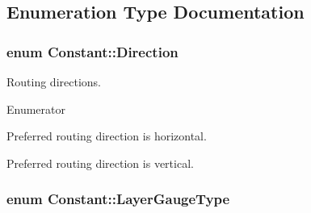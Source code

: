 \subsection{Enumeration Type Documentation}
\hypertarget{namespaceConstant_ac081a99f2b64361919ed5d9f37c0f9af}{
\subsubsection[{Direction}]{\setlength{\rightskip}{0pt plus 5cm}enum {\bf Constant\-::\-Direction}}}\label{namespaceConstant_ac081a99f2b64361919ed5d9f37c0f9af}
Routing directions. \begin{Desc}
\item[Enumerator]\par
\begin{description}
\item[{\em 
\hypertarget{namespaceConstant_ac081a99f2b64361919ed5d9f37c0f9afa7a545ff2d744fe30bfac294dfe9d03db}{Horizontal}\label{namespaceConstant_ac081a99f2b64361919ed5d9f37c0f9afa7a545ff2d744fe30bfac294dfe9d03db}
}]Preferred routing direction is horizontal. \item[{\em 
\hypertarget{namespaceConstant_ac081a99f2b64361919ed5d9f37c0f9afa63ce9cc57c99cccca96aa1157113da34}{Vertical}\label{namespaceConstant_ac081a99f2b64361919ed5d9f37c0f9afa63ce9cc57c99cccca96aa1157113da34}
}]Preferred routing direction is vertical. \end{description}
\end{Desc}
\hypertarget{namespaceConstant_ab2e46a17cc373a268c5c24fa0e2067e5}{
\subsubsection[{Layer\-Gauge\-Type}]{\setlength{\rightskip}{0pt plus 5cm}enum {\bf Constant\-::\-Layer\-Gauge\-Type}}}\label{namespaceConstant_ab2e46a17cc373a268c5c24fa0e2067e5}
